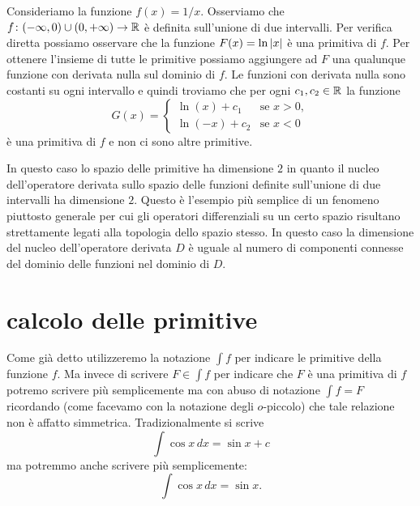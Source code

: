 \begin{example}
\label{ex:primitive_non_connesso}%
\mymark{*}%
Consideriamo la funzione $f(x) = 1/x$. Osserviamo che
$f\colon (-\infty, 0) \cup (0,+\infty)\to {\mathbb R}$ è definita sull'unione di due
intervalli. Per verifica diretta possiamo osservare che la funzione
$F(x) = \ln {\left|x\right|}$ è una primitiva di $f$. Per ottenere l'insieme di tutte
le primitive possiamo aggiungere ad $F$ una qualunque funzione con derivata
nulla sul dominio di $f$. Le funzioni con derivata nulla sono costanti su ogni
intervallo e quindi troviamo che per ogni $c_1, c_2\in {\mathbb R}$ la funzione
\[
G(x) =
\begin{cases}
  \ln (x) + c_1 &\text{se $x>0$},\\
  \ln (-x) + c_2 & \text{se $x<0$}
\end{cases}
\]
è una primitiva di $f$ e non ci sono altre primitive.

In questo caso lo spazio delle primitive ha dimensione $2$ in quanto il nucleo
dell'operatore derivata sullo spazio delle funzioni definite sull'unione di
due intervalli ha dimensione $2$.
Questo è l'esempio più semplice di un fenomeno piuttosto generale per cui gli
operatori differenziali su un certo spazio risultano strettamente legati alla
topologia dello spazio stesso. In questo caso la dimensione del nucleo
dell'operatore derivata $D$ è uguale al numero di componenti connesse del
dominio delle funzioni nel dominio di $D$.
\end{example}

\section{calcolo delle primitive}

Come già detto utilizzeremo la notazione $\int f$ per indicare le primitive
della funzione $f$.
Ma invece di scrivere $F\in \int f$
per indicare che $F$ è una primitiva di $f$
potremo scrivere
più semplicemente ma con abuso di notazione $\int f = F$
ricordando (come facevamo con la notazione degli $o$-piccolo) che tale relazione
non è affatto simmetrica.
Tradizionalmente si scrive
\begin{equation}\label{eq:4137878}
  \int \cos x\, dx = \sin x + c 
\end{equation}
ma potremmo anche scrivere più semplicemente:
%
\begin{equation}\label{eq:489417}
  \int \cos x\, dx = \sin x.
\end{equation}

